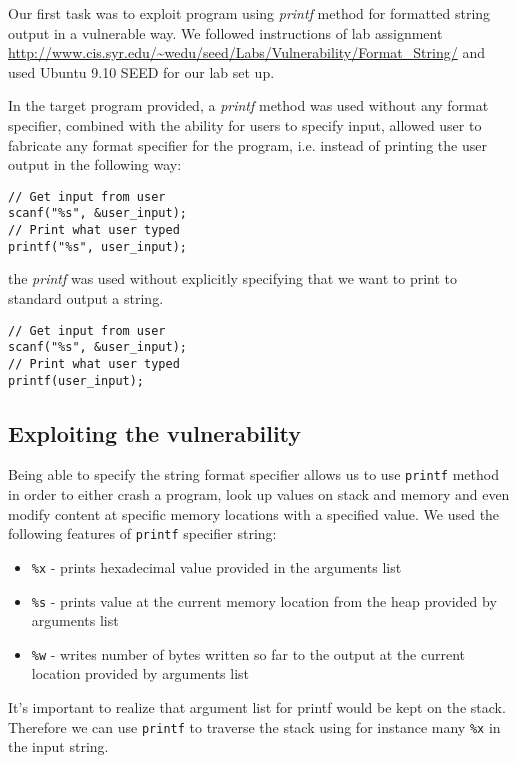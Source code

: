 \documentclass[12pt, a4paper, pdflatex]{article}
\begin{document}
Our first task was to exploit program using \emph{printf} method for formatted string output in a vulnerable way. We followed instructions of lab assignment  \url{http://www.cis.syr.edu/~wedu/seed/Labs/Vulnerability/Format_String/}
and used Ubuntu 9.10 SEED for our lab set up.

In the target program provided, a \emph{printf} method was used without any format specifier, combined with the ability for users to specify input, allowed user to fabricate any format specifier for the program, i.e. instead of printing the user output in the following way:
\vspace{1em}
\lstset{
	captionpos=b,
	frame=single,
	language=C,
  breaklines=true,
	caption=Fragment of code that would not include the vulnerability,
	label=chroot:vul
}
\begin{lstlisting}
// Get input from user
scanf("%s", &user_input);
// Print what user typed
printf("%s", user_input);
\end{lstlisting}
the \emph{printf} was used without explicitly specifying that we want to print to standard output a string.
\vspace{1em}
\lstset{
	captionpos=b,
	frame=single,
	language=C,
  breaklines=true,
	caption=Fragment of includes the vulnerability,
	label=chroot:vul2
}
\begin{lstlisting}
// Get input from user
scanf("%s", &user_input);
// Print what user typed
printf(user_input);
\end{lstlisting}


\subsection{Exploiting the vulnerability}
Being able to specify the string format specifier allows us to use \texttt{printf} method in order to either crash a program, look up values on stack and memory and even modify content at specific memory locations with a specified value. We used the following features of \texttt{printf} specifier string:
\begin{itemize}
	\item \texttt{\%x} - prints hexadecimal value provided in the arguments list
	\item \texttt{\%s} - prints value at the current memory location from the heap provided by arguments list
	\item \texttt{\%w} - writes number of bytes written so far to the output at the current location provided by arguments list
\end{itemize}
It's important to realize that argument list for printf would be kept on the stack. Therefore we can use \texttt{printf} to traverse the stack using for instance many \texttt{\%x} in the input string.
\end{document}
